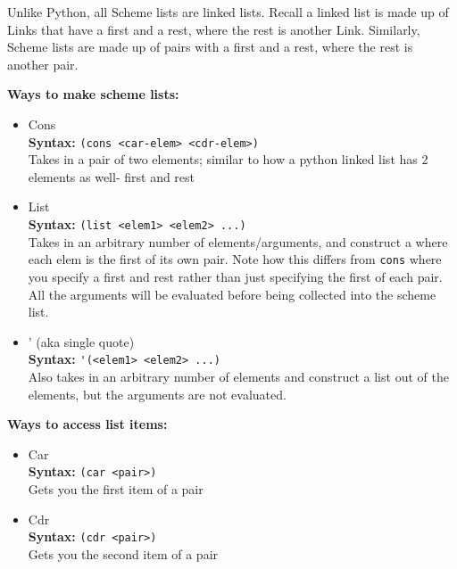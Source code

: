 Unlike Python, all Scheme lists are linked lists. Recall a linked list is made up of Links that have a first and a rest, where the rest is another Link. Similarly, Scheme lists are made up of pairs with a first and a rest, where the rest is another pair.

\textbf{Ways to make scheme lists:}
\begin{itemize}
\item Cons \\
\textbf{Syntax:} \lstinline{(cons <car-elem> <cdr-elem>)} \\
Takes in a pair of two elements; similar to how a python linked list has 2 elements as well- first and rest
\item List \\
\textbf{Syntax:} \lstinline{(list <elem1> <elem2> ...)} \\
Takes in an arbitrary number of elements/arguments, and construct a where each elem is the first of its own pair. Note how this differs from \lstinline{cons} where you specify a first and rest rather than just specifying the first of each pair. All the arguments will be evaluated before being collected into the scheme list.
\item ' (aka single quote) \\
\textbf{Syntax:} \lstinline{'(<elem1> <elem2> ...)} \\
Also takes in an arbitrary number of elements and construct a list out of the elements, but the arguments are not evaluated.
\end{itemize}

\textbf{Ways to access list items:}
\begin{itemize}
\item Car \\
\textbf{Syntax:} \lstinline{(car <pair>)} \\
Gets you the first item of a pair
\item Cdr \\ 
\textbf{Syntax:} \lstinline{(cdr <pair>)} \\
Gets you the second item of a pair
\end{itemize}